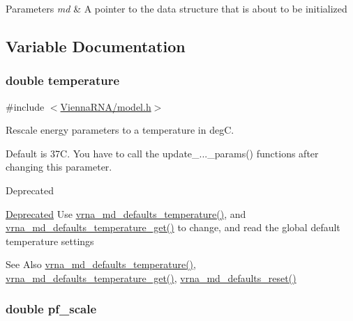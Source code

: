 \begin{DoxyParams}{Parameters}
{\em md} & A pointer to the data structure that is about to be initialized \\
\hline
\end{DoxyParams}


\subsection{Variable Documentation}
\hypertarget{group__model__details_gab4b11c8d9c758430960896bc3fe82ead}{
\subsubsection[{temperature}]{\setlength{\rightskip}{0pt plus 5cm}double temperature}}\label{group__model__details_gab4b11c8d9c758430960896bc3fe82ead}


{\ttfamily \#include $<$\hyperlink{model_8h}{Vienna\-R\-N\-A/model.\-h}$>$}



Rescale energy parameters to a temperature in deg\-C. 

Default is 37\-C. You have to call the update\-\_\-...\-\_\-params() functions after changing this parameter. \begin{DoxyRefDesc}{Deprecated}
\item[\hyperlink{deprecated__deprecated000081}{Deprecated}]Use \hyperlink{group__model__details_gaf9e527e9a2f7e6fd6e42bc6e602f5445}{vrna\-\_\-md\-\_\-defaults\-\_\-temperature()}, and \hyperlink{group__model__details_ga96b24a74437f9ba46c4e06343155bf46}{vrna\-\_\-md\-\_\-defaults\-\_\-temperature\-\_\-get()} to change, and read the global default temperature settings \begin{DoxySeeAlso}{See Also}
\hyperlink{group__model__details_gaf9e527e9a2f7e6fd6e42bc6e602f5445}{vrna\-\_\-md\-\_\-defaults\-\_\-temperature()}, \hyperlink{group__model__details_ga96b24a74437f9ba46c4e06343155bf46}{vrna\-\_\-md\-\_\-defaults\-\_\-temperature\-\_\-get()}, \hyperlink{group__model__details_ga70834424cf804d149937de89f80ceb45}{vrna\-\_\-md\-\_\-defaults\-\_\-reset()} 
\end{DoxySeeAlso}
\end{DoxyRefDesc}
\hypertarget{group__model__details_gad3b22044065acc6dee0af68931b52cfd}{
\subsubsection[{pf\-\_\-scale}]{\setlength{\rightskip}{0pt plus 5cm}double pf\-\_\-scale}}\label{group__model__details_gad3b22044065acc6dee0af68931b52cfd}


